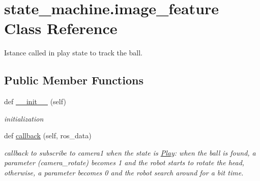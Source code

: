 \hypertarget{classstate__machine_1_1image__feature}{}\section{state\+\_\+machine.\+image\+\_\+feature Class Reference}
\label{classstate__machine_1_1image__feature}


Istance called in play state to track the ball.  


\subsection*{Public Member Functions}
\begin{DoxyCompactItemize}
\item 
def \hyperlink{classstate__machine_1_1image__feature_a719ee46dbe292cfe76d9b20b3d752b9e}{\+\_\+\+\_\+init\+\_\+\+\_\+} (self)
\begin{DoxyCompactList}\small\item\em initialization \end{DoxyCompactList}\item 
def \hyperlink{classstate__machine_1_1image__feature_a18e75f60a2a7f566add766b5f892c6f5}{callback} (self, ros\+\_\+data)
\begin{DoxyCompactList}\small\item\em callback to subscribe to camera1 when the state is \hyperlink{classstate__machine_1_1Play}{Play}\+: when the ball is found, a parameter (camera\+\_\+rotate) becomes 1 and the robot starts to rotate the head, otherwise, a parameter becomes 0 and the robot search around for a bit time. \end{DoxyCompactList}\end{DoxyCompactItemize}
